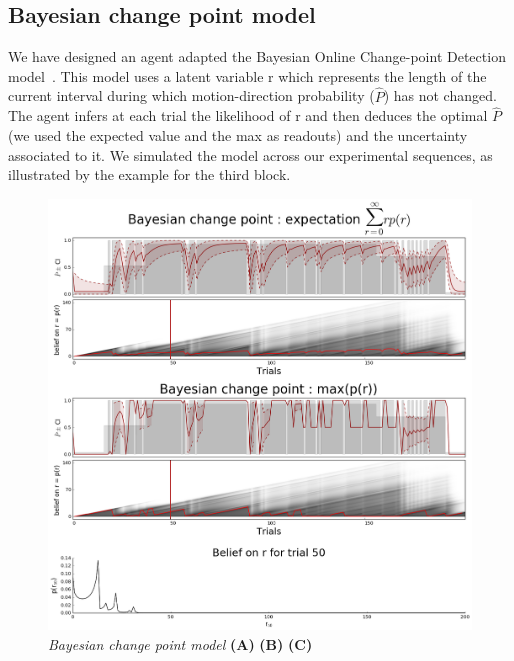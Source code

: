 \documentclass[profile,final,english, draft]{article}%
\begin{document}
\subsection{Bayesian change point model}

We have designed an agent adapted the Bayesian Online Change-point Detection model~\parencite{AdamsMackay2007}. This model uses a latent variable r which represents the length of the current interval during which motion-direction probability ($\hat{P}$) has not changed. The agent infers at each trial the likelihood  of r and then deduces the optimal $\hat{P}$ (we used the expected value and the max as readouts) and the uncertainty associated to it. We simulated the model across our experimental sequences, as illustrated by the example for the third block.

\begin{figure}%

\begin{center} 
    \includegraphics[width=1\linewidth]{bayesianchangepoint}
\end{center}


\caption{\emph{Bayesian change point model} \textbf{(A)} 
\textbf{(B)} 
\textbf{(C)}  }
\label{fig:results_bcp}
\end{figure}
\end{document}
